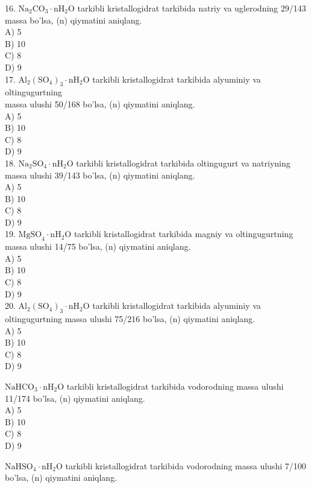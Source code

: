 16. $\mathrm{Na}_{2} \mathrm{CO}_{3} \cdot \mathrm{nH}_{2} \mathrm{O}$ tarkibli kristallogidrat tarkibida natriy va uglerodning 29/143 massa bo'lsa, (n) qiymatini aniqlang.\\
A) 5\\
B) 10\\
C) 8\\
D) 9\\
17. $\mathrm{Al}_{2}\left(\mathrm{SO}_{4}\right)_{3} \cdot \mathrm{nH}_{2} \mathrm{O}$ tarkibli kristallogidrat tarkibida alyuminiy va oltingugurtning\\
massa ulushi 50/168 bo'lsa, (n) qiymatini aniqlang.\\
A) 5\\
B) 10\\
C) 8\\
D) 9\\
18. $\mathrm{Na}_{2} \mathrm{SO}_{4} \cdot \mathrm{nH}_{2} \mathrm{O}$ tarkibli kristallogidrat tarkibida oltingugurt va natriyning massa ulushi 39/143 bo'lsa, (n) qiymatini aniqlang.\\
A) 5\\
B) 10\\
C) 8\\
D) 9\\
19. $\mathrm{MgSO}_{4} \cdot \mathrm{nH}_{2} \mathrm{O}$ tarkibli kristallogidrat tarkibida magniy va oltingugurtning massa ulushi 14/75 bo'lsa, (n) qiymatini aniqlang.\\
A) 5\\
B) 10\\
C) 8\\
D) 9\\
20. $\mathrm{Al}_{2}\left(\mathrm{SO}_{4}\right)_{3} \cdot \mathrm{nH}_{2} \mathrm{O}$ tarkibli kristallogidrat tarkibida alyuminiy va oltingugurtning massa ulushi 75/216 bo'lsa, (n) qiymatini aniqlang.\\
A) 5\\
B) 10\\
C) 8\\
D) 9
  \item $\mathrm{NaHCO}_{3} \cdot \mathrm{nH}_{2} \mathrm{O}$ tarkibli kristallogidrat tarkibida vodorodning massa ulushi 11/174 bo'lsa, (n) qiymatini aniqlang.\\
A) 5\\
B) 10\\
C) 8\\
D) 9\\
  \item $\mathrm{NaHSO}_{4} \cdot \mathrm{nH}_{2} \mathrm{O}$ tarkibli kristallogidrat tarkibida vodorodning massa ulushi 7/100 bo'lsa, (n) qiymatini aniqlang.\\
